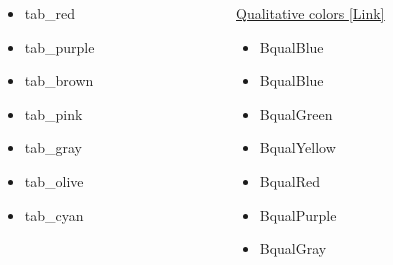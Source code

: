 \documentclass[aspectratio=169,11pt]{beamer}
\begin{document}
\begin{frame}{\insertsection}
\begin{columns}[t]
\begin{column}{0.24\textwidth}
\begin{itemize}
            \item \textcolor{tab_red}{tab\_red}
            \item \textcolor{tab_purple}{tab\_purple}
            \item \textcolor{tab_brown}{tab\_brown}
            \item \textcolor{tab_pink}{tab\_pink}
            \item \textcolor{tab_gray}{tab\_gray}
            \item \textcolor{tab_olive}{tab\_olive}
            \item \textcolor{tab_cyan}{tab\_cyan}
            \end{itemize}
        \end{column}
        \begin{column}{0.24\textwidth}
            \underline{Qualitative colors \href{https://personal.sron.nl/~pault/}{[Link]}}
            \begin{itemize}
            \item \textcolor{BqualBlue}{BqualBlue}
            \item \textcolor{BqualCyan}{BqualBlue}
            \item \textcolor{BqualGreen}{BqualGreen}
            \item \textcolor{BqualYellow}{BqualYellow}
            \item \textcolor{BqualRed}{BqualRed}
            \item \textcolor{BqualPurple}{BqualPurple}
            \item \textcolor{BqualGrey}{BqualGray}
            \end{itemize}
        \end{column}
    \end{columns}
\end{frame}
\end{document}
